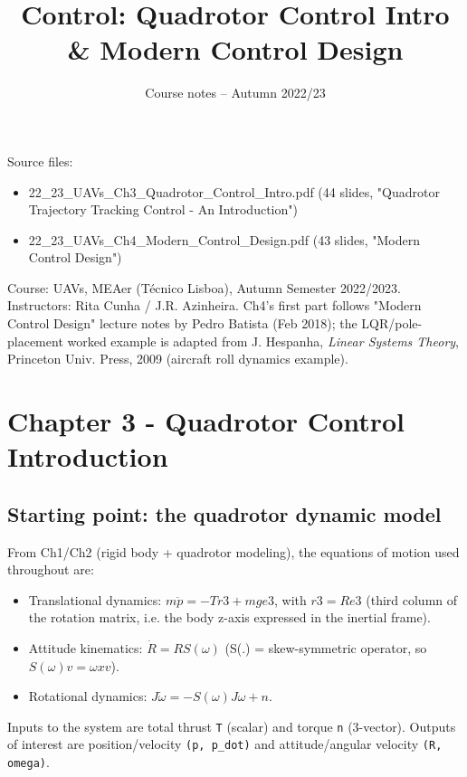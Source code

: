 \documentclass[11pt]{article}
\title{Control: Quadrotor Control Intro \& Modern Control Design}
\author{Course notes -- Autumn 2022/23}
\date{}
\begin{document}
\maketitle
\tableofcontents
\vspace{1em}

Source files:
\begin{itemize}
\item 22\_\allowbreak{}23\_\allowbreak{}UAVs\_\allowbreak{}Ch3\_\allowbreak{}Quadrotor\_\allowbreak{}Control\_\allowbreak{}Intro.pdf (44 slides, "Quadrotor Trajectory Tracking Control - An Introduction")
\item 22\_\allowbreak{}23\_\allowbreak{}UAVs\_\allowbreak{}Ch4\_\allowbreak{}Modern\_\allowbreak{}Control\_\allowbreak{}Design.pdf (43 slides, "Modern Control Design")
\end{itemize}

Course: UAVs, MEAer (Técnico Lisboa), Autumn Semester 2022/2023. Instructors: Rita Cunha / J.R. Azinheira.
Ch4's first part follows "Modern Control Design" lecture notes by Pedro Batista (Feb 2018); the LQR/pole-placement worked example is adapted from J. Hespanha, \textit{Linear Systems Theory}, Princeton Univ. Press, 2009 (aircraft roll dynamics example).

\section{Chapter 3 - Quadrotor Control Introduction}

\subsection{Starting point: the quadrotor dynamic model}
From Ch1/Ch2 (rigid body + quadrotor modeling), the equations of motion used throughout are:

\begin{itemize}
\item Translational dynamics: $m \ddot{p} = -T r3 + m g e3$, with $r3 = R e3$ (third column of the rotation matrix, i.e. the body z-axis expressed in the inertial frame).
\item Attitude kinematics: $\dot{R} = R S(\omega)$ (S(.) = skew-symmetric operator, so $S(\omega) v = \omega x v$).
\item Rotational dynamics: $J \dot{\omega} = -S(\omega) J \omega + n$.
\end{itemize}

Inputs to the system are total thrust \texttt{T} (scalar) and torque \texttt{n} (3-vector). Outputs of interest are position/velocity \texttt{(p, p\_\allowbreak{}dot)} and attitude/angular velocity \texttt{(R, omega)}.
\end{document}
